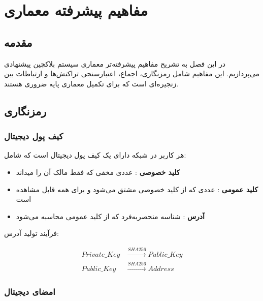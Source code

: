 \chapter{مفاهیم پیشرفته معماری}

\section{مقدمه}
در این فصل به تشریح مفاهیم پیشرفته‌تر معماری سیستم بلاکچین پیشنهادی می‌پردازیم. این مفاهیم شامل رمزنگاری، اجماع، اعتبارسنجی تراکنش‌ها و ارتباطات بین زنجیره‌ای است که برای تکمیل معماری پایه ضروری هستند.

\section{رمزنگاری }

\subsection{کیف پول دیجیتال }

هر کاربر در شبکه دارای یک کیف پول دیجیتال است که شامل:

\begin{itemize}
    \item \textbf{کلید خصوصی }: عددی مخفی که فقط مالک آن را میداند
    \item \textbf{کلید عمومی }: عددی که از کلید خصوصی مشتق می‌شود و برای همه قابل مشاهده است
    \item \textbf{آدرس }: شناسه منحصربه‌فرد که از کلید عمومی محاسبه می‌شود
\end{itemize}

فرآیند تولید آدرس:

\begin{latin}
\begin{equation}
\begin{aligned}
Private\_Key &\xrightarrow{SHA256} Public\_Key \\
Public\_Key &\xrightarrow{SHA256} Address
\end{aligned}
\end{equation}
\end{latin}

\subsection{امضای دیجیتال }

